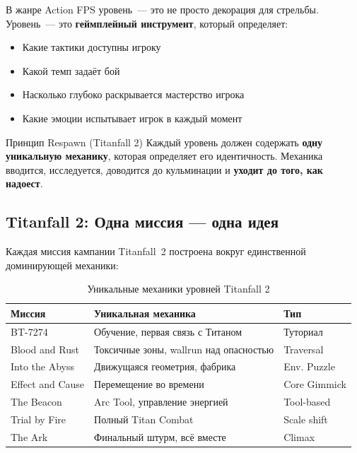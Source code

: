\documentclass[a4paper,11pt]{report}
\begin{document}
В жанре Action FPS уровень~--- это не просто декорация для стрельбы. Уровень~--- это
\textbf{геймплейный инструмент}, который определяет:
\begin{itemize}[leftmargin=*]
  \item Какие тактики доступны игроку
  \item Какой темп задаёт бой
  \item Насколько глубоко раскрывается мастерство игрока
  \item Какие эмоции испытывает игрок в каждый момент
\end{itemize}

\begin{principle}{Принцип Respawn (Titanfall 2)}
Каждый уровень должен содержать \textbf{одну уникальную механику}, которая
определяет его идентичность. Механика вводится, исследуется, доводится до
кульминации и \textbf{уходит до того, как надоест}.
\end{principle}

\subsection{Titanfall 2: Одна миссия --- одна идея}

Каждая миссия кампании Titanfall~2 построена вокруг единственной
доминирующей механики:

\begin{table}[H]
\centering
\caption{Уникальные механики уровней Titanfall 2}
\label{tab:tf2missions}
\begin{tabularx}{\textwidth}{@{}lXl@{}}
\toprule
\textbf{Миссия} & \textbf{Уникальная механика} & \textbf{Тип} \\
\midrule
BT-7274 & Обучение, первая связь с Титаном & Туториал \\
Blood and Rust & Токсичные зоны, wallrun над опасностью & Traversal \\
Into the Abyss & Движущаяся геометрия, фабрика & Env. Puzzle \\
Effect and Cause & Перемещение во времени & Core Gimmick \\
The Beacon & Arc Tool, управление энергией & Tool-based \\
Trial by Fire & Полный Titan Combat & Scale shift \\
The Ark & Финальный штурм, всё вместе & Climax \\
\bottomrule
\end{tabularx}
\end{table}
\end{document}
